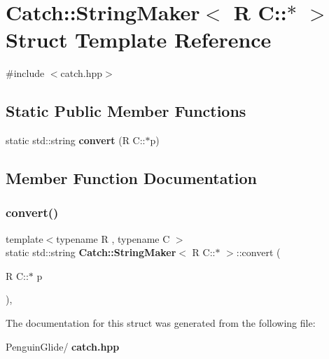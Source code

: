 \section{Catch\+::String\+Maker$<$ R C\+::$\ast$ $>$ Struct Template Reference}
\label{struct_catch_1_1_string_maker_3_01_r_01_c_1_1_5_01_4}


{\ttfamily \#include $<$catch.\+hpp$>$}

\subsection*{Static Public Member Functions}
\begin{DoxyCompactItemize}
\item 
static std\+::string \textbf{ convert} (R C\+::$\ast$p)
\end{DoxyCompactItemize}


\subsection{Member Function Documentation}
\mbox{\label{struct_catch_1_1_string_maker_3_01_r_01_c_1_1_5_01_4_af69c15e0b406e945777137fe4a333731}} 
\subsubsection{convert()}
{\footnotesize\ttfamily template$<$typename R , typename C $>$ \\
static std\+::string \textbf{ Catch\+::\+String\+Maker}$<$ R C\+::$\ast$ $>$\+::convert (\begin{DoxyParamCaption}\item[{R C\+::$\ast$}]{p }\end{DoxyParamCaption})\hspace{0.3cm}{\ttfamily [inline]}, {\ttfamily [static]}}



The documentation for this struct was generated from the following file\+:\begin{DoxyCompactItemize}
\item 
Penguin\+Glide/\textbf{ catch.\+hpp}\end{DoxyCompactItemize}
